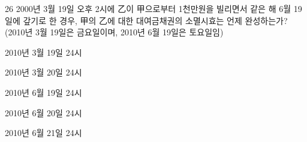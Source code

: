 \begin{question}{26}
2000년 3월 19일 오후 2시에 乙이 甲으로부터 1천만원을 빌리면서 같은 해 6월 19일에 갚기로 한 경우, 甲의 乙에 대한 대여금채권의 소멸시효는 언제 완성하는가? (2010년 3월 19일은 금요일이며, 2010년 6월 19일은 토요일임)
\begin{choices}
  \item 2010년 3월 19일 24시
  \item 2010년 3월 20일 24시
  \item 2010년 6월 19일 24시
  \item 2010년 6월 20일 24시
  \item 2010년 6월 21일 24시
\end{choices}
\end{question}
